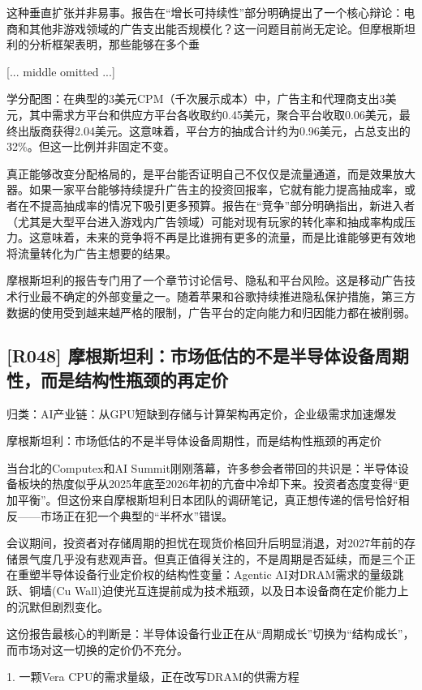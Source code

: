 \documentclass[11pt]{ctexart}
\begin{document}
这种垂直扩张并非易事。报告在“增长可持续性”部分明确提出了一个核心辩论：电商和其他非游戏领域的广告支出能否规模化？这一问题目前尚无定论。但摩根斯坦利的分析框架表明，那些能够在多个垂

[... middle omitted ...]

学分配图：在典型的3美元CPM（千次展示成本）中，广告主和代理商支出3美元，其中需求方平台和供应方平台各收取约0.45美元，聚合平台收取0.06美元，最终出版商获得2.04美元。这意味着，平台方的抽成合计约为0.96美元，占总支出的32\%。但这一比例并非固定不变。

真正能够改变分配格局的，是平台能否证明自己不仅仅是流量通道，而是效果放大器。如果一家平台能够持续提升广告主的投资回报率，它就有能力提高抽成率，或者在不提高抽成率的情况下吸引更多预算。报告在“竞争”部分明确指出，新进入者（尤其是大型平台进入游戏内广告领域）可能对现有玩家的转化率和抽成率构成压力。这意味着，未来的竞争将不再是比谁拥有更多的流量，而是比谁能够更有效地将流量转化为广告主想要的结果。

摩根斯坦利的报告专门用了一个章节讨论信号、隐私和平台风险。这是移动广告技术行业最不确定的外部变量之一。随着苹果和谷歌持续推进隐私保护措施，第三方数据的使用受到越来越严格的限制，广告平台的定向能力和归因能力都在被削弱。

\subsection{[R048] 摩根斯坦利：市场低估的不是半导体设备周期性，而是结构性瓶颈的再定价}
{\small\color{refgray}归类：AI产业链：从GPU短缺到存储与计算架构再定价，企业级需求加速爆发}

摩根斯坦利：市场低估的不是半导体设备周期性，而是结构性瓶颈的再定价

当台北的Computex和AI Summit刚刚落幕，许多参会者带回的共识是：半导体设备板块的热度似乎从2025年底至2026年初的亢奋中冷却下来。投资者态度变得“更加平衡”。但这份来自摩根斯坦利日本团队的调研笔记，真正想传递的信号恰好相反——市场正在犯一个典型的“半杯水”错误。

会议期间，投资者对存储周期的担忧在现货价格回升后明显消退，对2027年前的存储景气度几乎没有悲观声音。但真正值得关注的，不是周期是否延续，而是三个正在重塑半导体设备行业定价权的结构性变量：Agentic AI对DRAM需求的量级跳跃、铜墙(Cu Wall)迫使光互连提前成为技术瓶颈，以及日本设备商在定价能力上的沉默但剧烈变化。

这份报告最核心的判断是：半导体设备行业正在从“周期成长”切换为“结构成长”，而市场对这一切换的定价仍不充分。

1. 一颗Vera CPU的需求量级，正在改写DRAM的供需方程
\end{document}
